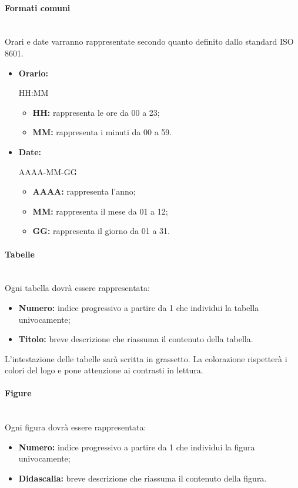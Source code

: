 \documentclass[11pt,a4paper]{article}
\begin{document}
	\paragraph{Formati comuni}
	\noindent \\ 
	Orari e date varranno rappresentate secondo quanto definito dallo standard ISO 8601. 

	\begin{itemize}
	\item \textbf{Orario:} 
	\begin{center}
		HH:MM
	\end{center}
	\begin{itemize}
		\item \textbf{HH:} rappresenta le ore da 00 a 23;
		\item \textbf{MM:} rappresenta i minuti da 00 a 59.
	\end{itemize} 

	\item \textbf{Date:}
	\begin{center}
		AAAA-MM-GG
	\end{center}
	\begin{itemize}
	\item \textbf{AAAA:} rappresenta l'anno;
	\item \textbf{MM:} rappresenta il mese da 01 a 12;
	\item \textbf{GG:} rappresenta il giorno da 01 a 31.
	\end{itemize}

	\end{itemize}
	
	\paragraph{Tabelle}	
\noindent \\		
	Ogni tabella dovrà essere rappresentata:
	\begin{itemize}
	\item \textbf{Numero:} indice progressivo a partire da 1 che individui la tabella univocamente;
	\item \textbf{Titolo:} breve descrizione che riassuma il contenuto della tabella.
	\end{itemize}
L'intestazione delle tabelle sarà scritta in grassetto. La colorazione rispetterà i colori del logo e pone attenzione ai contrasti in lettura.

	
	
	\paragraph{Figure}
\noindent \\	
	Ogni figura dovrà essere rappresentata:
	\begin{itemize}
		\item \textbf{Numero:} indice progressivo a partire da 1 che individui la figura univocamente;
		\item \textbf{Didascalia:} breve descrizione che riassuma il contenuto della figura.
	\end{itemize}
	
\end{document}
